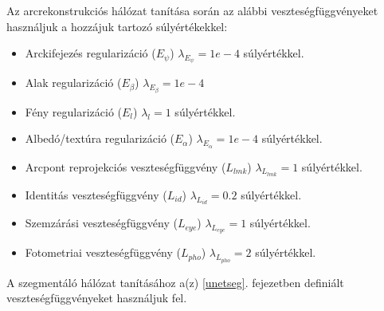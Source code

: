 \documentclass[12pt,a4]{article}
\begin{document}
        Az arcrekonstrukciós hálózat tanítása során az alábbi veszteségfüggvényeket használjuk a hozzájuk tartozó súlyértékekkel:
        \begin{itemize}
            \item Arckifejezés regularizáció ($E_{\psi}$) $\lambda_{E_{\psi}} = 1e - 4$ súlyértékkel.
            
            \item Alak regularizáció ($E_{\beta}$) $\lambda_{E_{\beta}} = 1e - 4$
            
            \item Fény regularizáció ($E_{l}$) $\lambda_{l} = 1$ súlyértékkel.
            
            \item Albedó/textúra regularizáció ($E_{\alpha}$) $\lambda_{E_{\alpha}} = 1e-4$ súlyértékkel.
            
            \item Arcpont reprojekciós veszteségfüggvény ($L_{lmk}$)
            $\lambda_{L_{lmk}} = 1$ súlyértékkel.
            
            \item Identitás veszteségfüggvény ($L_{id}$)
            $\lambda_{L_{id}} = 0.2$ súlyértékkel.
            
            \item Szemzárási veszteségfüggvény ($L_{eye}$)
            $\lambda_{L_{eye}} = 1$ súlyértékkel.
            
            \item Fotometriai veszteségfüggvény ($L_{pho}$)
            $\lambda_{L_{pho}} = 2$ súlyértékkel.
        
        \end{itemize}

        A szegmentáló hálózat tanításához a(z) \ref{unetseg}. fejezetben definiált veszteségfüggvényeket használjuk fel.
\end{document}
